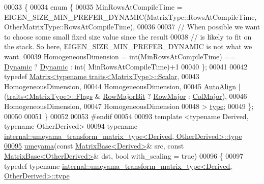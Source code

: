\begin{DoxyCode}
00033 \{
00034   \textcolor{keyword}{enum} \{
00035     MinRowsAtCompileTime = EIGEN\_SIZE\_MIN\_PREFER\_DYNAMIC(MatrixType::RowsAtCompileTime, 
      OtherMatrixType::RowsAtCompileTime),
00036 
00037     \textcolor{comment}{// When possible we want to choose some small fixed size value since the result}
00038     \textcolor{comment}{// is likely to fit on the stack. So here, EIGEN\_SIZE\_MIN\_PREFER\_DYNAMIC is not what we want.}
00039     HomogeneousDimension = int(MinRowsAtCompileTime) == \hyperlink{namespace_eigen_ad81fa7195215a0ce30017dfac309f0b2}{Dynamic} ? \hyperlink{namespace_eigen_ad81fa7195215a0ce30017dfac309f0b2}{Dynamic} : int(
      MinRowsAtCompileTime)+1
00040   \};
00041 
00042   \textcolor{keyword}{typedef} \hyperlink{group___core___module_class_eigen_1_1_matrix}{Matrix<typename traits<MatrixType>::Scalar},
00043     HomogeneousDimension,
00044     HomogeneousDimension,
00045     \hyperlink{group__enums_ggaacded1a18ae58b0f554751f6cdf9eb13a28d63c0dd8560827162decfd898804f4}{AutoAlign} | (\hyperlink{struct_eigen_1_1internal_1_1traits}{traits<MatrixType>::Flags} & 
      \hyperlink{group__flags_gae4f56c2a60bbe4bd2e44c5b19cbe8762}{RowMajorBit} ? \hyperlink{group__enums_ggaacded1a18ae58b0f554751f6cdf9eb13acfcde9cd8677c5f7caf6bd603666aae3}{RowMajor} : \hyperlink{group__enums_ggaacded1a18ae58b0f554751f6cdf9eb13a0cbd4bdd0abcfc0224c5fcb5e4f6669a}{ColMajor}),
00046     HomogeneousDimension,
00047     HomogeneousDimension
00048   > \hyperlink{group___core___module_class_eigen_1_1_matrix}{type};
00049 \};
00050 
00051 \}
00052 
00053 \textcolor{preprocessor}{#endif}
00054 
00093 \textcolor{keyword}{template} <\textcolor{keyword}{typename} Derived, \textcolor{keyword}{typename} OtherDerived>
00094 \textcolor{keyword}{typename} \hyperlink{group___core___module_class_eigen_1_1_matrix}{internal::umeyama\_transform\_matrix\_type<Derived, OtherDerived>::type}
\hyperlink{group___geometry___module_ga033d6550c1fc82e232f2b4c380c19a54}{00095} \hyperlink{group___geometry___module_ga033d6550c1fc82e232f2b4c380c19a54}{umeyama}(\textcolor{keyword}{const} \hyperlink{group___core___module_class_eigen_1_1_matrix_base}{MatrixBase<Derived>}& src, \textcolor{keyword}{const} 
      \hyperlink{group___core___module_class_eigen_1_1_matrix_base}{MatrixBase<OtherDerived>}& dst, \textcolor{keywordtype}{bool} with\_scaling = \textcolor{keyword}{true})
00096 \{
00097   \textcolor{keyword}{typedef} \textcolor{keyword}{typename} 
      \hyperlink{group___core___module_class_eigen_1_1_matrix}{internal::umeyama\_transform\_matrix\_type<Derived, OtherDerived>::type}

\end{DoxyCode}
